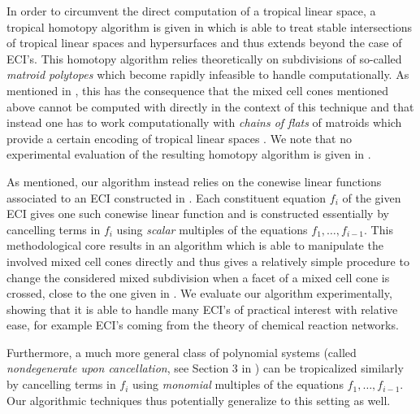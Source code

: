 \documentclass[a4paper]{article}
\theoremstyle{remark}
\begin{document}
In order to circumvent the direct computation of a tropical linear
space, a tropical homotopy algorithm is given in
\cite{daiseyFrameworkGeneralizedTropical2024,
  daiseyTropicalHomotopyContinuation2025} which is able to treat
stable intersections of tropical linear spaces and hypersurfaces and
thus extends beyond the case of ECI's. This homotopy algorithm relies
theoretically on subdivisions of so-called {\em matroid polytopes}
which become rapidly infeasible to handle computationally. As
mentioned in \cite{daiseyTropicalHomotopyContinuation2025}, this has
the consequence that the mixed cell cones mentioned above cannot be
computed with directly in the context of this technique and that
instead one has to work computationally with {\em chains of flats} of
matroids which provide a certain encoding of tropical linear spaces
\cite[see e.g. Theorem 4.2.6
in][]{maclaganIntroductionTropicalGeometry2021}. We note that no
experimental evaluation of the resulting homotopy algorithm is given
in \cite{daiseyFrameworkGeneralizedTropical2024,
  daiseyTropicalHomotopyContinuation2025}.

As mentioned, our algorithm instead relies on the conewise linear
functions associated to an ECI constructed in
\cite{esterovEngineeredCompleteIntersections2024,
  esterovEngineeredCompleteIntersections2025}. Each constituent
equation $f_i$ of the given ECI gives one such conewise linear
function and is constructed essentially by cancelling terms in $f_i$
using \textit{scalar} multiples of the equations
$f_1,\ldots, f_{i-1}$. This methodological core results in an algorithm
which is able to manipulate the involved mixed cell cones directly and
thus gives a relatively simple procedure to change the considered
mixed subdivision when a facet of a mixed cell cone is crossed, close
to the one given in \cite{jensenTropicalHomotopyContinuation2016}. We
evaluate our algorithm experimentally, showing that it is able to
handle many ECI's of practical interest with relative ease, for
example ECI's coming from the theory of chemical reaction networks.

Furthermore, a much more general class of polynomial systems
(called \textit{nondegenerate upon cancellation}, see Section 3 in
\cite{esterovEngineeredCompleteIntersections2025}) can be tropicalized
similarly by cancelling terms in $f_i$ using \textit{monomial}
multiples of the equations $f_1,\ldots, f_{i-1}$. Our algorithmic techniques
thus potentially generalize to this setting as well.
\end{document}
